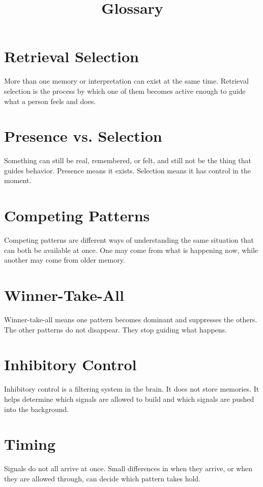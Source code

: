 \documentclass[10pt,twocolumn]{article}
\title{Glossary}
\author{}
\date{}
\begin{document}
\maketitle

\section{Retrieval Selection}
More than one memory or interpretation can exist at the same time. Retrieval selection is the process by which one of them becomes active enough to guide what a person feels and does.

\section{Presence vs. Selection}
Something can still be real, remembered, or felt, and still not be the thing that guides behavior. Presence means it exists. Selection means it has control in the moment.

\section{Competing Patterns}
Competing patterns are different ways of understanding the same situation that can both be available at once. One may come from what is happening now, while another may come from older memory.

\section{Winner-Take-All}
Winner-take-all means one pattern becomes dominant and suppresses the others. The other patterns do not disappear. They stop guiding what happens.

\section{Inhibitory Control}
Inhibitory control is a filtering system in the brain. It does not store memories. It helps determine which signals are allowed to build and which signals are pushed into the background.

\section{Timing}
Signals do not all arrive at once. Small differences in when they arrive, or when they are allowed through, can decide which pattern takes hold.
\end{document}
